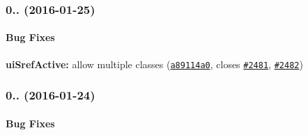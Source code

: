{\bfseries {\bfseries \label{_0.2.17}%
 \subsubsection*{0.. (2016-\/01-\/25)}}}

{\bfseries {\bfseries }}

{\bfseries {\bfseries \paragraph*{Bug Fixes}}}

{\bfseries {\bfseries }}

{\bfseries {\bfseries 
\begin{DoxyItemize}
\item {\bfseries ui\+Sref\+Active\+:} allow multiple classes (\href{https://github.com/angular-ui/ui-router/commit/a89114a083813c1a7280c48fc18e626caa5a31f4}{\tt a89114a0}, closes \href{https://github.com/angular-ui/ui-router/issues/2481}{\tt \#2481}, \href{https://github.com/angular-ui/ui-router/issues/2482}{\tt \#2482})
\end{DoxyItemize}}}

{\bfseries {\bfseries \label{_0.2.16}%
 \subsubsection*{0.. (2016-\/01-\/24)}}}

{\bfseries {\bfseries }}

{\bfseries {\bfseries \paragraph*{Bug Fixes}}}

{\bfseries {\bfseries }}

